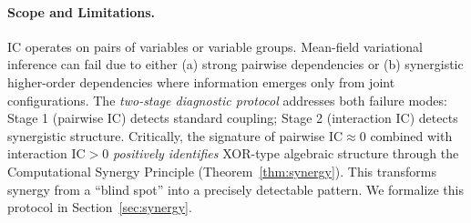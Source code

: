 \documentclass[10pt]{article} %
\theoremstyle{plain}
\theoremstyle{definition}
\newcommand{\IC}{\mathrm{IC}}  %
\begin{document}
\paragraph{Scope and Limitations.} IC operates on pairs of variables or variable groups. Mean-field variational inference can fail due to either (a) strong pairwise dependencies or (b) synergistic higher-order dependencies where information emerges only from joint configurations. The \emph{two-stage diagnostic protocol} addresses both failure modes: Stage 1 (pairwise IC) detects standard coupling; Stage 2 (interaction IC) detects synergistic structure. Critically, the signature of pairwise $\IC \approx 0$ combined with interaction $\IC > 0$ \emph{positively identifies} XOR-type algebraic structure through the Computational Synergy Principle (Theorem~\ref{thm:synergy}). This transforms synergy from a ``blind spot'' into a precisely detectable pattern. We formalize this protocol in Section~\ref{sec:synergy}.
\end{document}
